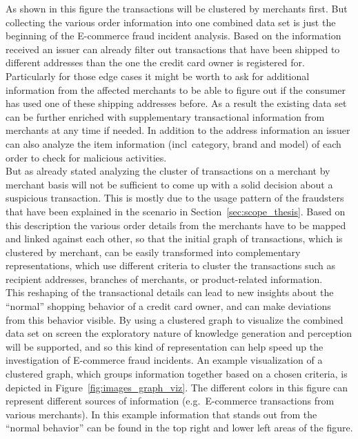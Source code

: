 As shown in this figure the transactions will be clustered by merchants first. But collecting the various order information into one combined data set is just the beginning of the \gls{E-commerce} fraud incident analysis. Based on the information received an issuer can already filter out transactions that have been shipped to different addresses than the one the credit card owner is registered for. Particularly for those edge cases it might be worth to ask for additional information from the affected merchants to be able to figure out if the consumer has used one of these shipping addresses before. As a result the existing data set can be further enriched with supplementary transactional information from merchants at any time if needed. In addition to the address information an issuer can also analyze the item information (\gls{incl}\ category, brand and model) of each order to check for malicious activities. \\

But as already stated analyzing the cluster of transactions on a merchant by merchant basis will not be sufficient to come up with a solid decision about a suspicious transaction. This is mostly due to the usage pattern of the fraudsters that have been explained in the scenario in Section~\ref{sec:scope_thesis}. Based on this description the various order details from the merchants have to be mapped and linked against each other, so that the initial graph of transactions, which is clustered by merchant, can be easily transformed into complementary representations, which use different criteria to cluster the transactions such as recipient addresses, branches of merchants, or product-related information. \\

This reshaping of the transactional details can lead to new insights about the ``normal'' shopping behavior of a credit card owner, and can make deviations from this behavior visible. By using a clustered graph to visualize the combined data set on screen the exploratory nature of knowledge generation and perception will be supported, and so this kind of representation can help speed up the investigation of \gls{E-commerce} fraud incidents. An example visualization of a clustered graph, which groups information together based on a chosen criteria, is depicted in Figure~\ref{fig:images_graph_viz}. The different colors in this figure can represent different sources of information (e.g.\ \gls{E-commerce} transactions from various merchants). In this example information that stands out from the ``normal behavior'' can be found in the top right and lower left areas of the figure. \@

